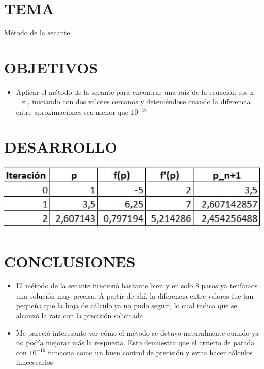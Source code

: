 \documentclass[12pt]{article}
\begin{document}
\section*{TEMA}
{Método de la secante}

\vspace{0.5cm}

\section*{OBJETIVOS}
\begin{itemize}
    \item { Aplicar el método de la secante para encontrar una raíz de la ecuación 
    cos x =x , iniciando con dos valores cercanos y deteniéndose cuando la diferencia entre 
    aproximaciones sea menor que $10^{-16}$}

\end{itemize}

\vspace{0.5cm}

\section*{DESARROLLO}


\begin{minipage}{0.95\textwidth}
    \raggedleft
    \includegraphics[width=1.15\textwidth]{inFiles/Figures/eje1.jpg}
\end{minipage}

\vspace{0.5cm}


\section*{CONCLUSIONES}
\begin{itemize}
    \item {El método de la secante funcionó bastante bien y en solo 8 pasos 
    ya teníamos una solución muy precisa. A partir de ahí, la diferencia entre valores fue tan pequeña 
    que la hoja de cálculo ya no pudo seguir, lo cual indica que se alcanzó la raíz con la precisión solicitada}

    \item {Me pareció interesante ver cómo el método se detuvo naturalmente cuando ya no podía mejorar más la respuesta. 
    Esto demuestra que el criterio de parada con $10^{-16}$ funciona como un buen control de precisión y evita hacer cálculos innecesarios}
\end{itemize}


\vspace{0.5cm}
\end{document}
